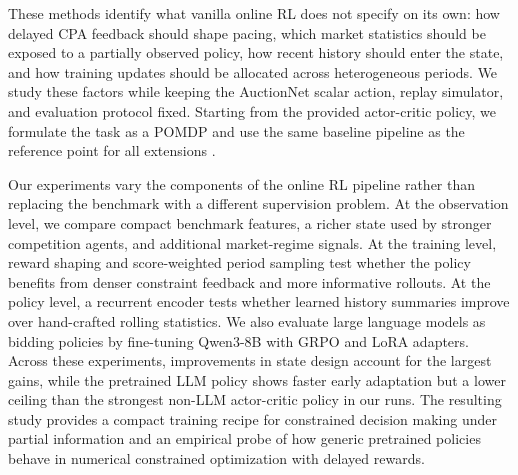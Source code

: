 \documentclass{article}
\begin{document}
These methods identify what vanilla online RL does not specify on its own: how
delayed CPA feedback should shape pacing, which market statistics should be
exposed to a partially observed policy, how recent history should enter the
state, and how training updates should be allocated across heterogeneous
periods. We study these factors while keeping the AuctionNet scalar action,
replay simulator, and evaluation protocol fixed. Starting from the provided
actor-critic policy, we formulate the task as a POMDP and use the same baseline
pipeline as the reference point for all extensions
\citep{cai2017realtime,wu2018budget,he2021unified}.

Our experiments vary the components of the online RL pipeline rather than
replacing the benchmark with a different supervision problem. At the observation
level, we compare compact benchmark features, a richer state used by stronger
competition agents, and additional market-regime signals. At the training level,
reward shaping and score-weighted period sampling test whether the policy
benefits from denser constraint feedback and more informative rollouts. At the
policy level, a recurrent encoder tests whether learned history summaries
improve over hand-crafted rolling statistics. We also evaluate large language
models as bidding policies by fine-tuning Qwen3-8B with GRPO and LoRA adapters.
Across these experiments, improvements in state design account for the largest
gains, while the pretrained LLM policy shows faster early adaptation but a lower
ceiling than the strongest non-LLM actor-critic policy in our runs. The resulting
study provides a compact training recipe for constrained decision making under
partial information and an empirical probe of how generic pretrained policies
behave in numerical constrained optimization with delayed rewards.

\end{document}
